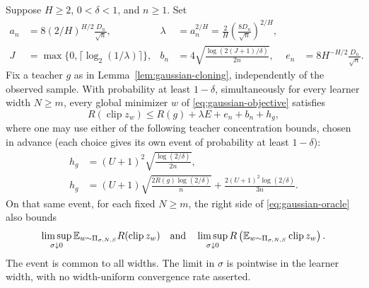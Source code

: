\begin{theorem}
\label{thm:gaussian-absorption}
Suppose $H\geq2$, $0<\delta<1$, and $n\geq1$.  Set
\begin{align}
 a_n&=8(2/H)^{H/2}\frac{D_n}{\sqrt n},&
 \lambda&=a_n^{2/H}
       =\frac2H\left(\frac{8D_n}{\sqrt n}\right)^{2/H},
       \label{eq:gaussian-calibration}\\
 J&=\max\{0,\lceil\log_2(1/\lambda)\rceil\},&
 b_n&=4\sqrt{\frac{\log(2(J+1)/\delta)}{2n}},&
 e_n&=8H^{-H/2}\frac{D_n}{\sqrt n}.
 \label{eq:gaussian-residuals}
\end{align}
Fix a teacher $g$ as in Lemma~\ref{lem:gaussian-cloning}, independently
of the observed sample.  With probability at least $1-\delta$,
simultaneously for every learner width $N\geq m$, every global
minimizer $w$ of \eqref{eq:gaussian-objective} satisfies
\begin{equation}
 R(\operatorname{clip}z_w)
 \leq R(g)+\lambda E+e_n+b_n+h_g,
 \label{eq:gaussian-oracle}
\end{equation}
where one may use either of the following teacher concentration bounds,
chosen in advance (each choice gives its own event of probability at
least $1-\delta$):
\begin{align}
 h_g&=(U+1)^2\sqrt{\frac{\log(2/\delta)}{2n}},
       \label{eq:gaussian-teacher-hoeffding}\\
 h_g&=(U+1)\sqrt{\frac{2R(g)\log(2/\delta)}n}
       +\frac{2(U+1)^2\log(2/\delta)}{3n}.
       \label{eq:gaussian-teacher-bernstein}
\end{align}
On that same event, for each fixed $N\geq m$, the right side of
\eqref{eq:gaussian-oracle} also bounds
\[
 \limsup_{\sigma\downarrow0}
   \mathbb E_{w\sim\Pi_{\sigma,N,S}}R(\operatorname{clip}z_w)
 \quad\hbox{and}\quad
 \limsup_{\sigma\downarrow0}
   R\left(\mathbb E_{w\sim\Pi_{\sigma,N,S}}\operatorname{clip}z_w\right).
\]
The event is common to all widths.  The limit in $\sigma$ is pointwise
in the learner width, with no width-uniform convergence rate asserted.
\end{theorem}
